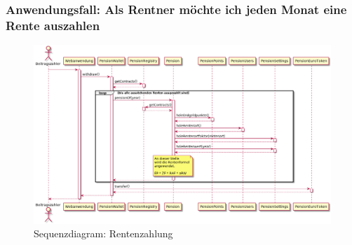 \subsubsection{Anwendungsfall: Als Rentner möchte ich jeden Monat eine Rente auszahlen}

\begin{figure}[H]
    \centering
    \includegraphics[width=6.0in]{images/usecase-payout.png}
    \caption{Sequenzdiagram: Rentenzahlung}
    \label{fig:asure_architecture}
\end{figure}